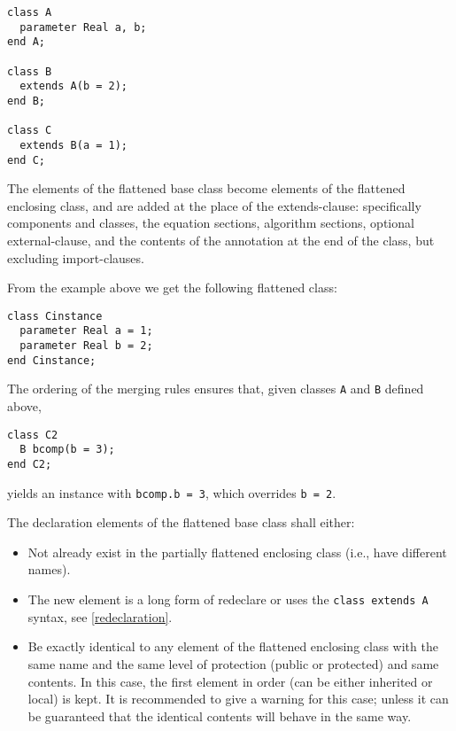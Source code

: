 \begin{example}
\begin{lstlisting}[language=modelica]
class A
  parameter Real a, b;
end A;

class B
  extends A(b = 2);
end B;

class C
  extends B(a = 1);
end C;
\end{lstlisting}
\end{example}

The elements of the flattened base class become elements of the flattened enclosing class, and are added at the place of the extends-clause: specifically components and classes, the equation sections, algorithm sections, optional external-clause, and the contents of the annotation at the end of the class, but excluding import-clauses.

\begin{nonnormative}
From the example above we get the following flattened class:
\begin{lstlisting}[language=modelica]
class Cinstance
  parameter Real a = 1;
  parameter Real b = 2;
end Cinstance;
\end{lstlisting}

The ordering of the merging rules ensures that, given classes \lstinline!A! and \lstinline!B! defined above,
\begin{lstlisting}[language=modelica]
class C2
  B bcomp(b = 3);
end C2;
\end{lstlisting}
yields an instance with \lstinline!bcomp.b = 3!, which overrides \lstinline!b = 2!.
\end{nonnormative}

The declaration elements of the flattened base class shall either:
\begin{itemize}
\item
  Not already exist in the partially flattened enclosing class
  (i.e., have different names).
\item
  The new element is a long form of redeclare or uses the \lstinline!class extends A! syntax, see \cref{redeclaration}.
\item
  Be exactly identical to any element of the flattened enclosing class
  with the same name and the same level of protection (public or
  protected) and same contents. In this case, the first element in order
  (can be either inherited or local) is kept. It is recommended to give
  a warning for this case; unless it can be guaranteed that the
  identical contents will behave in the same way.
\end{itemize}

